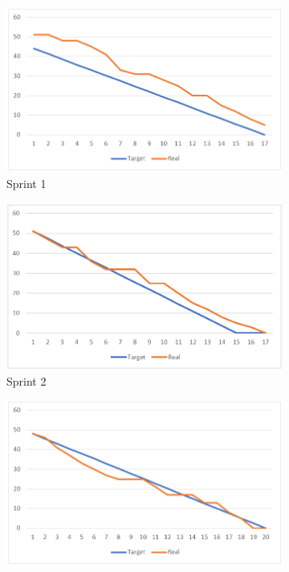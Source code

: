 \begin{figure}[hbtp]
\begin{subfigure}{.5\textwidth}
    \includegraphics[width=\linewidth]{figuras/sprint1.png}
    \caption{Sprint 1}
    \label{fig:sprint1}
\end{subfigure}
\begin{subfigure}{.5\textwidth}
    \includegraphics[width=\linewidth]{figuras/sprint2.png}
    \caption{Sprint 2}
    \label{fig:sprint2}
\end{subfigure}
\begin{subfigure}{.5\textwidth}
    \includegraphics[width=\linewidth]{figuras/sprint3.png}

\end{subfigure}
\end{figure}
